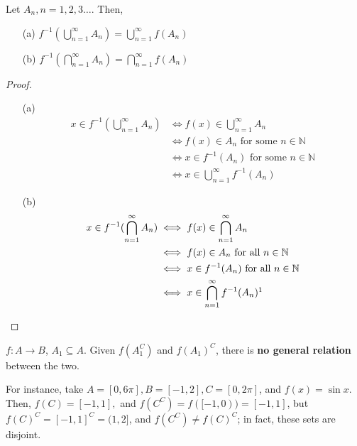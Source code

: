 \documentclass[12pt]{article}
\begin{document}
\begin{proposition}
  Let $A_n, n = 1,2,3 \dots$. Then, 
  \begin{itemize}
    \item[(a)] $f^{-1}(\bigcup_{n=1}^{\infty}A_n) = \bigcup_{n=1}^{\infty}f(A_n)$
    \item[(b)] $f^{-1}(\bigcap_{n=1}^{\infty}A_n) = \bigcap_{n=1}^{\infty}f(A_n)$
  \end{itemize}
\end{proposition}

\begin{proof}[Proof]\footnotemark
  \begin{itemize}
    \item[(a)]
  \begin{align*}
    x \in f^{-1}(\bigcup_{n=1}^{\infty}A_n) &\iff f(x) \in \bigcup_{n=1}^\infty A_n\\
    & \iff f(x) \in A_n \text{ for some } n \in \mathbb{N}\\
    & \iff x \in f^{-1}(A_n) \text{ for some } n \in \mathbb{N}\\
    & \iff x \in \bigcup_{n=1}^\infty f^{-1}(A_n)
  \end{align*}
  \item[(b)]
  \begin{align*}
    x \in f^{-1}(\bigcap_{n=1}^{\infty}A_n) &\iff f(x) \in \bigcap_{n=1}^\infty A_n\\
    &\iff f(x) \in A_n \text{ for all } n \in \mathbb{N}\\
    &\iff x \in f^{-1}(A_n) \text{ for all } n \in \mathbb{N}\\
    &\iff x \in \bigcap_{n=1}^\infty f^{-1}(A_n)\footnotemark
  \end{align*}
  \end{itemize}
\end{proof}

\begin{remark}
  $f: A \to B$, $A_1 \subseteq A$. Given $f(A_1^C)$ and $f(A_1)^C$, there is \textbf{no general relation} between the two.

  For instance, take $A = [0, 6 \pi], B = [-1, 2], C = [0, 2 \pi]$, and $f(x) = \sin x$. Then, $f(C) = [-1,1],$ and $f(C^C) = f([-1,0)) = [-1,1]$, but $f(C)^C = [-1,1]^C = (1,2]$, and $f(C^C) \neq f(C)^C$; in fact, these sets are disjoint.
\end{remark}
\end{document}
